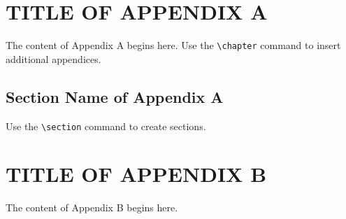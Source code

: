 \documentclass[11pt]{report}
\begin{document}
\begin{append}
\chapter{\MakeUppercase{Title of Appendix A}}
The content of Appendix A begins here. Use the \Verb|\chapter| command to insert additional appendices.
\section{Section Name of Appendix A}
Use the \Verb|\section| command to create sections.
\chapter{\MakeUppercase{Title of Appendix B}}
The content of Appendix B begins here.
\end{append}

\begin{bibliof}

\end{bibliof}
\end{document}

